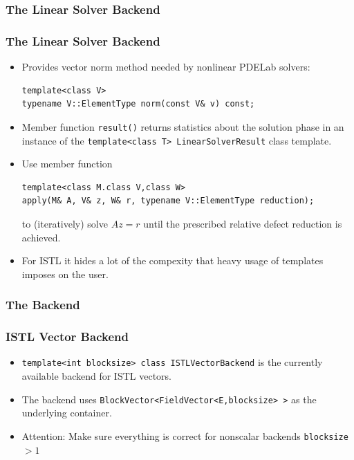 \subsubsection{The Linear Solver Backend}
\label{sec:line-solv-back}

\begin{frame}[fragile]
  \frametitle<presentation>{The Linear Solver Backend}
  \begin{itemize}
  \item Provides vector norm method needed by nonlinear PDELab solvers:
      \begin{lstlisting}
template<class V>
typename V::ElementType norm(const V& v) const;
      \end{lstlisting}
    \item Member function \lstinline!result()! returns statistics
      about the solution phase in an instance of the
      \lstinline!template<class T> LinearSolverResult! class template.
\item Use member function 
  \begin{lstlisting}
template<class M.class V,class W>
apply(M& A, V& z, W& r, typename V::ElementType reduction);
  \end{lstlisting}
  to (iteratively) solve $Az=r$ until the prescribed relative defect
  reduction is achieved.
  \item For ISTL it hides a lot of the compexity that heavy usage of
    templates imposes on the user.
  \end{itemize}
\end{frame}

\subsubsection{The Backend}
\label{sec:backend}

\begin{frame}
  \frametitle{ISTL Vector Backend}
  \begin{itemize}
  \item \lstinline!template<int blocksize> class ISTLVectorBackend!
    is the currently available backend for ISTL vectors.
  \item The backend uses
    \lstinline!BlockVector<FieldVector<E,blocksize> >! as the
    underlying container.
  \item Attention: Make sure everything is correct for nonscalar backends
    \lstinline!blocksize!$>1$
  \end{itemize}
\end{frame}

